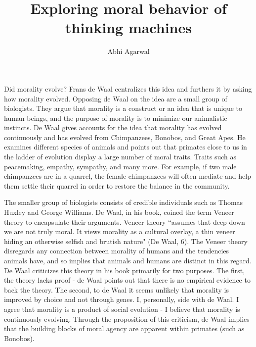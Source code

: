 \documentclass[11pt, oneside]{article}
\title{Exploring moral behavior of thinking machines}
\author{Abhi Agarwal}
\date{}
\begin{document}
\maketitle

\par Did morality evolve? Frans de Waal centralizes this idea and furthers it by asking how morality evolved. Opposing de Waal on the idea are a small group of biologists. They argue that morality is a construct or an idea that is unique to human beings, and the purpose of morality is to minimize our animalistic instincts. De Waal gives accounts for the idea that morality has evolved continuously and has evolved from Chimpanzees, Bonobos, and Great Apes. He examines different species of animals and points out that primates close to us in the ladder of evolution display a large number of moral traits. Traits such as peacemaking, empathy, sympathy, and many more. For example, if two male chimpanzees are in a quarrel, the female chimpanzees will often mediate and help them settle their quarrel in order to restore the balance in the community. 

\par The smaller group of biologists consists of credible individuals such as Thomas Huxley and George Williams. De Waal, in his book, coined the term Veneer theory to encapsulate their arguments. Veneer theory ``assumes that deep down we are not truly moral. It views morality as a cultural overlay, a thin veneer hiding an otherwise selfish and brutish nature" (De Waal, 6). The Veneer theory disregards any connection between morality of humans and the tendencies animals have, and so implies that animals and humans are distinct in this regard. De Waal criticizes this theory in his book primarily for two purposes. The first, the theory lacks proof - de Waal points out that there is no empirical evidence to back the theory. The second, to de Waal it seems unlikely that morality is improved by choice and not through genes. I, personally, side with de Waal. I agree that morality is a product of social evolution - I believe that morality is continuously evolving. Through the proposition of this criticism, de Waal implies that the building blocks of moral agency are apparent within primates (such as Bonobos).
\end{document}
